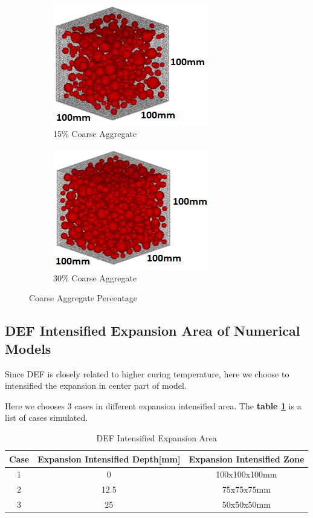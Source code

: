 \begin{figure}[!h]
\centering
\begin{subfigure}{.5\textwidth}
  \centering
  \includegraphics[width=.6\linewidth]{Files/Aggregate/A15.png}
  \caption{15\% Coarse Aggregate}
  \label{fig:A15_model1}
\end{subfigure}%
\begin{subfigure}{.5\textwidth}
  \centering
  \includegraphics[width=.6\linewidth]{Files/Aggregate/A30.png}
  \caption{30\% Coarse Aggregate}
  \label{fig:A30_model1}
\end{subfigure}
\caption{Coarse Aggregate Percentage}
\end{figure}

\subsection{DEF Intensified Expansion Area of Numerical Models}

Since DEF is closely related to higher curing temperature, here we choose to intensified the expansion in center part of model.

Here we chooses 3 cases in different expansion intensified area. The \textbf{table \ref{table:DEF_X}} is a list of cases simulated.

\begin{table}[ht!]
\centering
\begin{tabular}{||c c c||}
 \hline
 Case &  Expansion Intensified Depth[mm] &  Expansion Intensified Zone \\ [0.5ex]
 \hline\hline
 1 & 0 & 100x100x100mm \\
 2 & 12.5 & 75x75x75mm \\
 3 & 25 & 50x50x50mm \\ [0.5ex]
 \hline
\end{tabular}
\caption{DEF Intensified Expansion Area}
\label{table:DEF_X}
\end{table}

